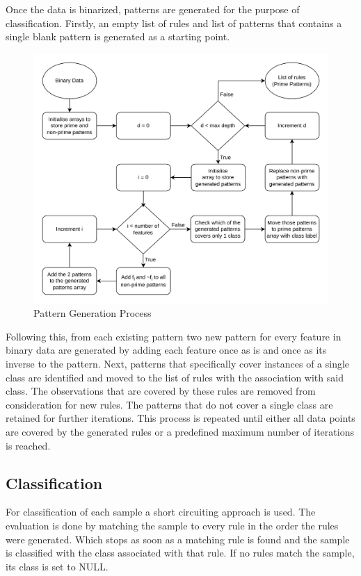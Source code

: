 \documentclass[pdflatex,sn-mathphys-num]{sn-jnl}%
\let\oldcaption\caption
\renewcommand{\caption}[1]{\oldcaption{\centering #1}}
\theoremstyle{thmstyleone}%
\theoremstyle{thmstyletwo}%
\theoremstyle{thmstylethree}%
\begin{document}
Once the data is binarized, patterns are generated for the purpose of classification.
Firstly, an empty list of rules and list of patterns that contains a single blank pattern is generated as a starting point.

\begin{figure}[ht!]
    \centering
    \includegraphics[width=0.8\linewidth]{Pattern.drawio.png}
    \caption{Pattern Generation Process}
    \label{fig:PatternGeneration}
\end{figure}

Following this, from each existing pattern two new pattern for every feature in binary data are generated by adding each feature once as is and once as its inverse to the pattern.
Next, patterns that specifically cover instances of a single class are identified and moved to the list of rules with the association with said class.
The observations that are covered by these rules are removed from consideration for new rules.
The patterns that do not cover a single class are retained for further iterations.
This process is repeated until either all data points are covered by the generated rules or a predefined maximum number of iterations is reached.

\subsection{Classification}
For classification of each sample a short circuiting approach is used.
The evaluation is done by matching the sample to every rule in the order the rules were generated.
Which stops as soon as a matching rule is found and the sample is classified with the class associated with that rule.
If no rules match the sample, its class is set to NULL.
\end{document}
